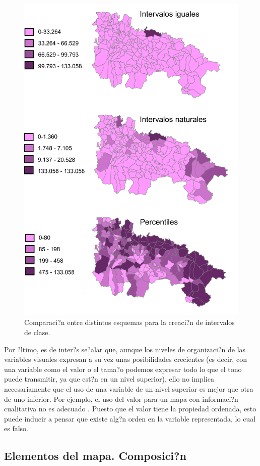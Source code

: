 \begin{itemize}
	\begin{figure}[!hbt]
	\centering
	\includegraphics[width=.7\columnwidth]{../es/Visualizacion/TiposIntervalosClases.pdf}
	\caption{\small Comparaci?n entre distintos esquemas para la creaci?n de intervalos de clase.}
	\label{Fig:TiposIntervalosClases} 
	\end{figure}


\end{itemize}


Por ?ltimo, es de inter?s se?alar que, aunque los niveles de organizaci?n de las variables visuales expresan a su vez unas posibilidades crecientes (es decir, con una variable como el valor o el tama?o podemos expresar todo lo que el tono puede transmitir, ya que est?n en un nivel superior), ello no implica necesariamente que el uso de una variable de un nivel superior es mejor que otra de uno inferior. Por ejemplo, el uso del valor para un mapa con informaci?n cualitativa no es adecuado . Puesto que el valor tiene la propiedad ordenada, esto puede inducir a pensar que existe alg?n orden en la variable representada, lo cual es falso. 



\subsection{Elementos del mapa. Composici?n}

